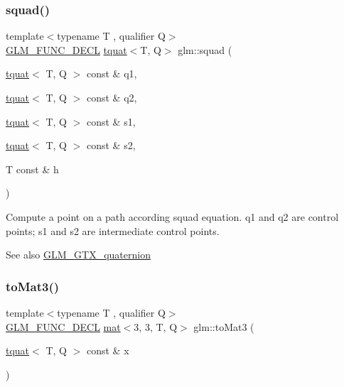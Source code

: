\subsubsection{\texorpdfstring{squad()}{squad()}}
{\footnotesize\ttfamily template$<$typename T , qualifier Q$>$ \\
\mbox{\hyperlink{setup_8hpp_ab2d052de21a70539923e9bcbf6e83a51}{G\+L\+M\+\_\+\+F\+U\+N\+C\+\_\+\+D\+E\+CL}} \mbox{\hyperlink{structglm_1_1tquat}{tquat}}$<$T, Q$>$ glm\+::squad (\begin{DoxyParamCaption}\item[{\mbox{\hyperlink{structglm_1_1tquat}{tquat}}$<$ T, Q $>$ const \&}]{q1,  }\item[{\mbox{\hyperlink{structglm_1_1tquat}{tquat}}$<$ T, Q $>$ const \&}]{q2,  }\item[{\mbox{\hyperlink{structglm_1_1tquat}{tquat}}$<$ T, Q $>$ const \&}]{s1,  }\item[{\mbox{\hyperlink{structglm_1_1tquat}{tquat}}$<$ T, Q $>$ const \&}]{s2,  }\item[{T const \&}]{h }\end{DoxyParamCaption})}

Compute a point on a path according squad equation. q1 and q2 are control points; s1 and s2 are intermediate control points.

\begin{DoxySeeAlso}{See also}
\mbox{\hyperlink{group__gtx__quaternion}{G\+L\+M\+\_\+\+G\+T\+X\+\_\+quaternion}} 
\end{DoxySeeAlso}
\mbox{\label{group__gtx__quaternion_ga433955cb703d982427fb53b540d02f3d}} 
\subsubsection{\texorpdfstring{to\+Mat3()}{toMat3()}}
{\footnotesize\ttfamily template$<$typename T , qualifier Q$>$ \\
\mbox{\hyperlink{setup_8hpp_ab2d052de21a70539923e9bcbf6e83a51}{G\+L\+M\+\_\+\+F\+U\+N\+C\+\_\+\+D\+E\+CL}} \mbox{\hyperlink{structglm_1_1mat}{mat}}$<$3, 3, T, Q$>$ glm\+::to\+Mat3 (\begin{DoxyParamCaption}\item[{\mbox{\hyperlink{structglm_1_1tquat}{tquat}}$<$ T, Q $>$ const \&}]{x }\end{DoxyParamCaption})}

